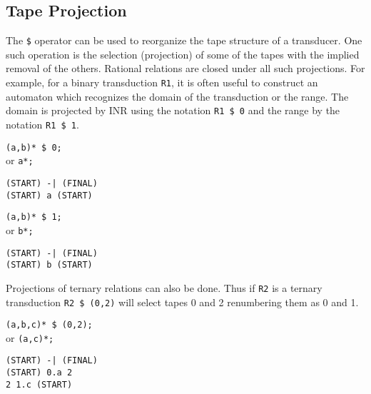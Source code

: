 \subsection{Tape Projection}
The \verb#$# operator can be used to reorganize the tape structure of a
transducer.
One such operation is the selection (projection) of some of the tapes with
the implied removal of the others.
Rational relations are closed under all such projections.
For example, for a binary transduction \verb#R1#, it is often useful to
construct an automaton which recognizes the domain of the transduction or
the range.
The domain is projected by INR using the notation \verb#R1 $ 0# and the
range by the notation \verb#R1 $ 1#.
\begin{center}\begin{minipage}[t]{3in}\begin{minipage}[t]{3in}\begin{tabbing}
\qquad \= \verb#(a,b)* $ 0;#\\
or \> \verb#a*;#
\end{tabbing}\end{minipage}\end{minipage}
\begin{minipage}[t]{1.6in}\begin{verbatim}
(START) -| (FINAL)
(START) a (START)
\end{verbatim}\end{minipage}\end{center}
\begin{center}\begin{minipage}[t]{3in}\begin{minipage}[t]{3in}\begin{tabbing}
\qquad \= \verb#(a,b)* $ 1;#\\
or \> \verb#b*;#
\end{tabbing}\end{minipage}\end{minipage}
\begin{minipage}[t]{1.6in}\begin{verbatim}
(START) -| (FINAL)
(START) b (START)
\end{verbatim}\end{minipage}\end{center}
Projections of ternary relations can also be done.
Thus if \verb#R2# is a ternary transduction \verb#R2 $ (0,2)# will select
tapes 0 and 2 renumbering them as 0 and 1.
\begin{center}\begin{minipage}[t]{3in}\begin{minipage}[t]{3in}\begin{tabbing}
\qquad \= \verb#(a,b,c)* $ (0,2);#\\
or \> \verb#(a,c)*;#
\end{tabbing}\end{minipage}\end{minipage}
\begin{minipage}[t]{1.6in}\begin{verbatim}
(START) -| (FINAL)
(START) 0.a 2
2 1.c (START)
\end{verbatim}\end{minipage}\end{center}

